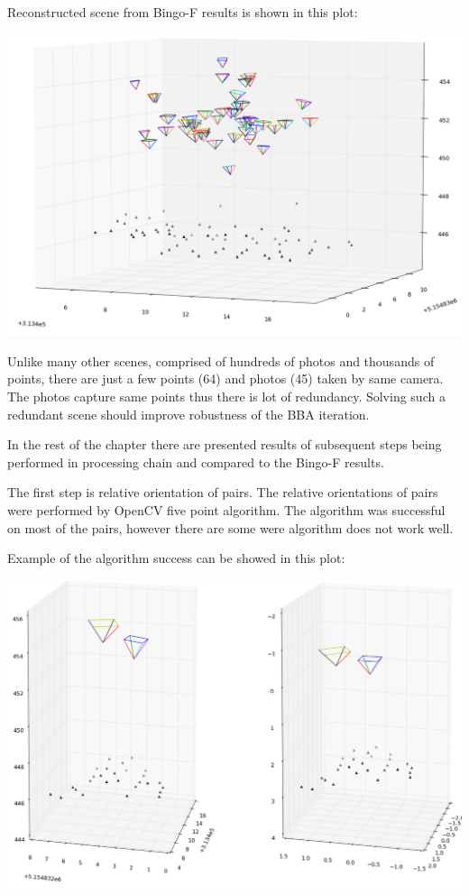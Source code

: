 \documentclass[a4paper,12pt]{article}
\begin{document}
Reconstructed  scene from Bingo-F results is shown in this plot:


\includegraphics[scale=0.4]{figures/bingo_result.png}

Unlike many other scenes, comprised of hundreds of photos and thousands of points,   
there are just a few points (64) and photos (45) taken by same camera. 
The photos capture same points thus there 
is lot of redundancy. Solving such a redundant scene should improve robustness of the BBA iteration. 

In the rest of the chapter there are presented results of subsequent steps being performed in processing chain and compared 
to the Bingo-F results.

The first step is relative orientation of pairs. The relative orientations of pairs were performed by OpenCV five point algorithm.
The algorithm was successful on most of the pairs, however there are some were algorithm does not work well.

Example of the algorithm success can be showed in this plot:


\includegraphics[scale=0.4]{figures/rel_or_576_598.png}
\end{document}

